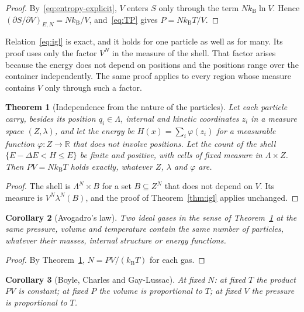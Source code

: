 \documentclass[11pt,a4paper]{article}
\newtheorem{theorem}{Theorem}[section]
\newtheorem{corollary}[theorem]{Corollary}
\theoremstyle{definition}
\theoremstyle{remark}
\newcommand{\R}{\mathbb{R}}
\newcommand{\kB}{k_{\mathrm{B}}}
\begin{document}
\begin{proof}
By~\eqref{eq:entropy-explicit}, $V$ enters $S$ only through the term $N\kB\ln V$.
Hence $(\partial S/\partial V)_{E,N}=N\kB/V$, and~\eqref{eq:TP} gives $P=N\kB T/V$.
\end{proof}

Relation~\eqref{eq:igl} is exact, and it holds for one particle as well as for many.
Its proof uses only the factor $V^{N}$ in the measure of the shell.
That factor arises because the energy does not depend on positions and the positions range over the container independently.
The same proof applies to every region whose measure contains $V$ only through such a factor.

\begin{theorem}[Independence from the nature of the particles]
\label{thm:carrier}
Let each particle carry, besides its position $q_i\in\Lambda$, internal and kinetic coordinates $z_i$ in a measure space $(Z,\lambda)$, and let the energy be $H(x)=\sum_i\varphi(z_i)$ for a measurable function $\varphi\colon Z\to\R$ that does not involve positions.
Let the count of the shell $\{E-\Delta E<H\le E\}$ be finite and positive, with cells of fixed measure in $\Lambda\times Z$.
Then $PV=N\kB T$ holds exactly, whatever $Z$, $\lambda$ and $\varphi$ are.
\end{theorem}

\begin{proof}
The shell is $\Lambda^{N}\times B$ for a set $B\subseteq Z^{N}$ that does not depend on $V$.
Its measure is $V^{N}\lambda^{N}(B)$, and the proof of Theorem~\ref{thm:igl} applies unchanged.
\end{proof}

\begin{corollary}[Avogadro's law]
\label{cor:avogadro}
Two ideal gases in the sense of Theorem~\ref{thm:carrier} at the same pressure, volume and temperature contain the same number of particles, whatever their masses, internal structure or energy functions.
\end{corollary}

\begin{proof}
By Theorem~\ref{thm:carrier}, $N=PV/(\kB T)$ for each gas.
\end{proof}

\begin{corollary}[Boyle, Charles and Gay-Lussac]
\label{cor:classical}
At fixed $N$: at fixed $T$ the product $PV$ is constant; at fixed $P$ the volume is proportional to $T$; at fixed $V$ the pressure is proportional to $T$.
\end{corollary}
\end{document}
